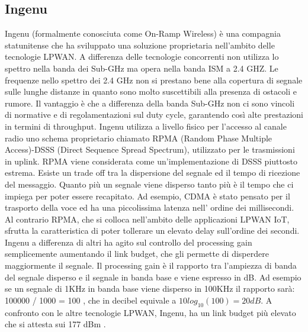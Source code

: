 \documentclass[12pt,a4paper,openright,twoside]{report}
\begin{document}
\subsection{Ingenu}
Ingenu (formalmente conosciuta come On-Ramp Wireless) \`e una compagnia statunitense che ha sviluppato una soluzione proprietaria nell'ambito delle tecnologie LPWAN. 
A differenza delle tecnologie concorrenti non utilizza lo spettro nella banda dei Sub-GHz ma opera nella banda ISM a 2.4 GHZ. 
Le frequenze nello spettro dei 2.4 GHz non si prestano bene alla copertura di segnale sulle lunghe distanze in quanto sono molto suscettibili alla presenza di ostacoli e rumore. 
Il vantaggio \`e che a differenza della banda Sub-GHz non ci sono vincoli di normative e di regolamentazioni sul duty cycle, garantendo cos\`i alte prestazioni in termini di throughput. 
Ingenu utilizza a livello fisico per l'accesso al canale radio uno schema proprietario chiamato RPMA (Random Phase Multiple Access)-DSSS (Direct Sequence Spread Spectrum), utilizzato per le trasmissioni in uplink. 
RPMA viene considerata come un'implementazione di DSSS piuttosto estrema. 
Esiste un trade off tra la dispersione del segnale ed il tempo di ricezione del messaggio. Quanto pi\`u un segnale viene disperso tanto pi\`u \`e il tempo che ci impiega per poter essere recapitato. 
Ad esempio, CDMA \`e stato pensato per il trasporto della voce ed ha una piccolissima latenza nell' ordine dei millisecondi. Al contrario RPMA, che si colloca nell'ambito delle applicazioni LPWAN IoT, sfrutta la caratteristica di poter tollerare un elevato delay sull'ordine dei secondi. 
Ingenu a differenza di altri ha agito sul controllo del processing gain semplicemente aumentando il link budget, che gli permette di disperdere maggiormente il segnale. 
Il processing gain \`e il rapporto tra l'ampiezza di banda del segnale disperso e il segnale in banda base e viene espresso in dB. 
Ad esempio se un segnale di 1KHz in banda base viene disperso in 100KHz il rapporto sarà: 100000 / 1000 = 100 , che in decibel equivale a $10 log_{10}(100) = 20 dB$. 
A confronto con le altre tecnologie LPWAN, Ingenu, ha un link budget pi\`u elevato che si attesta sui 177 dBm \cite{K6}.
\end{document}
